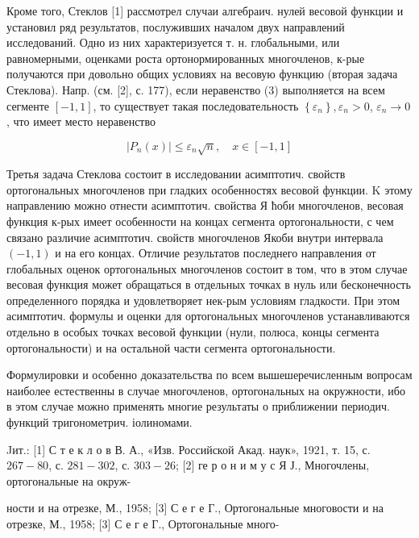 \documentclass[10pt]{article}
\begin{document}
Кроме того, Стеклов [1] рассмотрел случаи алгебраич. нулей весовой функции и установил ряд результатов, послуживших началом двух направлений исследований. Одно из них характеризуется т. н. глобальными, или равномерными, оценками роста ортонормированных многочленов, к-рые получаются при довольно общих условиях на весовую функцию (вторая задача Стеклова). Напр. (см. [2], с. 177), если неравенство (3) выполняется на всем сегменте $[-1,1]$, то существует такая последовательность $\left\{\varepsilon_{n}\right\}, \varepsilon_{n}>0$, $\varepsilon_{n} \rightarrow 0$, что имеет место неравенство



\[

\left|P_{n}(x)\right| \leqslant \varepsilon_{n} \sqrt{n}, \quad x \in[-1,1]

\]



Третья задача Стеклова состоит в исследовании асимптотич. свойств ортогональных многочленов при гладких особенностях весовой функции. $\mathrm{K}$ этому направлению можно отнести асимптотич. свойства Я ћоби многочленов, весовая функция к-рых имеет особенности на концах сегмента ортогональности, с чем связано различие асимптотич. свойств многочленов Якоби внутри интервала $(-1,1)$ и на его концах. Отличие результатов последнего направления от глобальных оценок ортогональных многочленов состоит в том, что в этом случае весовая функция может обращаться в отдельных точках в нуль или бесконечность определенного порядка и удовлетворяет нек-рым условиям гладкости. При этом асимптотич. формулы и оценки для ортогональных многочленов устанавливаются отдельно в особых точках весовой функции (нули, полюса, концы сегмента ортогональности) и на остальной части сегмента ортогональности.



Формулировки и особенно доказательства по всем вышешеречисленным вопросам наиболее естественны в случае многочленов, ортогональных на окружности, ибо в этом случае можно применять многие результаты о приближении периодич. функций тригонометрич. іолиномами.



Jит.: [1] С т е к л о в В. А., «Изв. Российской Акад. наук», 1921, т. 15, с. $267-80$, с. $281-302$, с. $303-26$; [2] ге р о н и м у с Я Ј., Многочлены, ортогональные на окруж-

ности и на отрезке, М., 1958; [3] С е г е Г., Ортогональные многовости и на отрезке, М., 1958; [3] С е г е Г., Ортогональные много-
\end{document}

